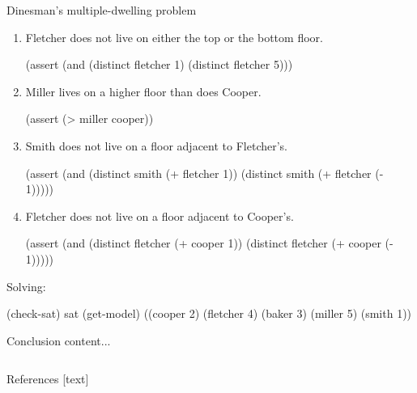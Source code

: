 \documentclass{beamer}
\begin{document}
\begin{frame}[fragile,t]
\begin{columns}[t,onlytextwidth]
\begin{column}{0.485\textwidth}
\begin{block}{Dinesman's multiple-dwelling problem~\cite{SICP}}
\begin{enumerate}
				\item Fletcher does not live on either the top or the bottom floor.
				\begin{smtlib}
					(assert (and (distinct fletcher 1)
					             (distinct fletcher 5)))
				\end{smtlib}
			
				\item Miller lives on a higher floor than does Cooper.
				\begin{smtlib}
					(assert (> miller cooper))
				\end{smtlib}
			
				\item Smith does not live on a floor adjacent to Fletcher's.
				\begin{smtlib}
					(assert (and (distinct smith (+ fletcher 1))
					             (distinct smith (+ fletcher (- 1)))))
				\end{smtlib}
			
				\item Fletcher does not live on a floor adjacent to Cooper's.
				\begin{smtlib}
					(assert (and (distinct fletcher (+ cooper 1))
					             (distinct fletcher (+ cooper (- 1)))))
				\end{smtlib}
			\end{enumerate}
		
			Solving:
			\begin{smtlib}
				(check-sat)
				sat
				(get-model)
				((cooper 2) (fletcher 4) (baker 3) (miller 5) (smith 1))
			\end{smtlib}
		\end{block}
	
		\begin{block}{Conclusion}
			content...
		\end{block}
	
	\end{column}
\end{columns}

\vspace{0.5em}

\begin{block}{References}
	[text]
	\printbibliography[heading=none]
\end{block}

\end{frame}
\end{document}

